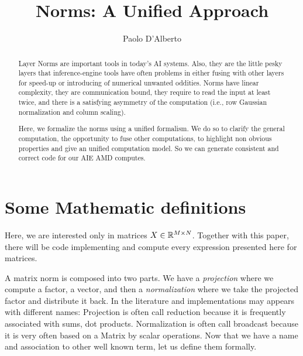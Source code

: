 \documentclass[acmsmall]{acmart}
\begin{document}
\title{Norms: A Unified Approach}

\author{Paolo D'Alberto}
\email{}

\renewcommand{\shortauthors}{D'Alberto et al.}

\begin{abstract}

  Layer Norms are important tools in today's AI systems.  Also, they
  are the little pesky layers that inference-engine tools have often
  problems in either fusing with other layers for speed-up or
  introducing of numerical unwanted oddities.  Norms have linear
  complexity, they are communication bound, they require to read the
  input at least twice, and there is a satisfying asymmetry of the
  computation (i.e., row Gaussian normalization and column scaling).
  
  Here, we formalize the norms using a unified formalism. We do so to
  clarify the general computation, the opportunity to fuse other
  computations, to highlight non obvious properties and give an
  unified computation model. So we can generate consistent and correct
  code for our AIE AMD computes.
  
\end{abstract}

\maketitle

\section{Some Mathematic definitions} 
\label{sec:introduction}
Here, we are interested only in matrices $X \in \mathbb{R}^{M \times
  N}$. Together with this paper, there will be code implementing and
compute every expression presented here for matrices.

A matrix norm is composed into two parts. We have a {\em projection}
where we compute a factor, a vector, and then a {\em normalization}
where we take the projected factor and distribute it back. In the
literature and implementations may appears with different names:
Projection is often call reduction because it is frequently associated
with sums, dot products. Normalization is often call broadcast because
it is very often based on a Matrix by scalar operations. Now that we
have a name and association to other well known term, let us define
them formally.
\end{document}
